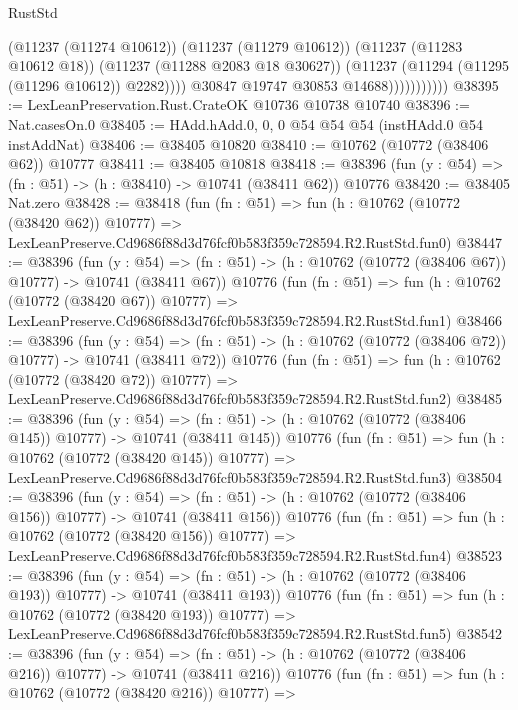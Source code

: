 \begin{lexlean}{RustStd}
\begin{coremodule}
                              (@11237 (@11274 @10612))
                              (@11237 (@11279 @10612))
                              (@11237 (@11283 @10612 @18))
                              (@11237 (@11288 @2083 @18 @30627))
                              (@11237 (@11294 (@11295 (@11296 @10612)) @2282))))
                          @30847
                          @19747
                          @30853
                          @14688)))))))))))
@38395 := LexLeanPreservation.Rust.CrateOK @10736 @10738 @10740
@38396 := Nat.casesOn.{0}
@38405 := HAdd.hAdd.{0, 0, 0} @54 @54 @54 (instHAdd.{0} @54 instAddNat)
@38406 := @38405 @10820
@38410 := @10762 (@10772 (@38406 @62)) @10777
@38411 := @38405 @10818
@38418 := @38396 (fun (y : @54) => (fn : @51) -> (h : @38410) -> @10741 (@38411 @62)) @10776
@38420 := @38405 Nat.zero
@38428 := @38418
    (fun (fn : @51) =>
    fun (h : @10762 (@10772 (@38420 @62)) @10777) =>
    LexLeanPreserve.Cd9686f88d3d76fcf0b583f359c728594.R2.RustStd.fun0)
@38447 := @38396
    (fun (y : @54) =>
    (fn : @51) -> (h : @10762 (@10772 (@38406 @67)) @10777) -> @10741 (@38411 @67))
    @10776
    (fun (fn : @51) =>
    fun (h : @10762 (@10772 (@38420 @67)) @10777) =>
    LexLeanPreserve.Cd9686f88d3d76fcf0b583f359c728594.R2.RustStd.fun1)
@38466 := @38396
    (fun (y : @54) =>
    (fn : @51) -> (h : @10762 (@10772 (@38406 @72)) @10777) -> @10741 (@38411 @72))
    @10776
    (fun (fn : @51) =>
    fun (h : @10762 (@10772 (@38420 @72)) @10777) =>
    LexLeanPreserve.Cd9686f88d3d76fcf0b583f359c728594.R2.RustStd.fun2)
@38485 := @38396
    (fun (y : @54) =>
    (fn : @51) -> (h : @10762 (@10772 (@38406 @145)) @10777) -> @10741 (@38411 @145))
    @10776
    (fun (fn : @51) =>
    fun (h : @10762 (@10772 (@38420 @145)) @10777) =>
    LexLeanPreserve.Cd9686f88d3d76fcf0b583f359c728594.R2.RustStd.fun3)
@38504 := @38396
    (fun (y : @54) =>
    (fn : @51) -> (h : @10762 (@10772 (@38406 @156)) @10777) -> @10741 (@38411 @156))
    @10776
    (fun (fn : @51) =>
    fun (h : @10762 (@10772 (@38420 @156)) @10777) =>
    LexLeanPreserve.Cd9686f88d3d76fcf0b583f359c728594.R2.RustStd.fun4)
@38523 := @38396
    (fun (y : @54) =>
    (fn : @51) -> (h : @10762 (@10772 (@38406 @193)) @10777) -> @10741 (@38411 @193))
    @10776
    (fun (fn : @51) =>
    fun (h : @10762 (@10772 (@38420 @193)) @10777) =>
    LexLeanPreserve.Cd9686f88d3d76fcf0b583f359c728594.R2.RustStd.fun5)
@38542 := @38396
    (fun (y : @54) =>
    (fn : @51) -> (h : @10762 (@10772 (@38406 @216)) @10777) -> @10741 (@38411 @216))
    @10776
    (fun (fn : @51) =>
    fun (h : @10762 (@10772 (@38420 @216)) @10777) =>

\end{coremodule}
\end{lexlean}
